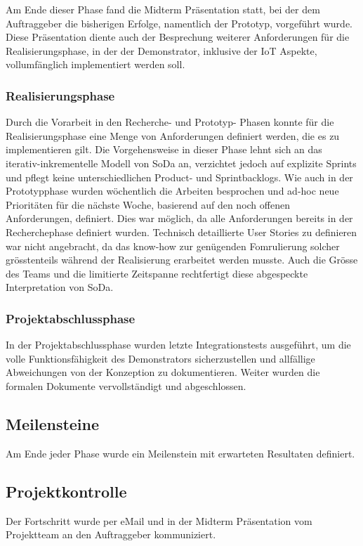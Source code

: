 Am Ende dieser Phase fand die Midterm Präsentation statt, bei der dem Auftraggeber die bisherigen Erfolge, namentlich der Prototyp, vorgeführt wurde. Diese Präsentation diente auch der Besprechung weiterer Anforderungen für die Realisierungsphase, in der der Demonstrator, inklusive der IoT Aspekte, vollumfänglich implementiert werden soll.

\subsubsection{Realisierungsphase}
\label{pm_subsubsec:Realisierungsphase}
Durch die Vorarbeit in den Recherche- und Prototyp- Phasen konnte für die Realisierungsphase eine Menge von Anforderungen definiert werden, die es zu implementieren gilt. Die Vorgehensweise in dieser Phase lehnt sich an das iterativ-inkrementelle Modell von SoDa an, verzichtet jedoch auf explizite Sprints und pflegt keine unterschiedlichen Product- und Sprintbacklogs. Wie auch in der Prototypphase wurden wöchentlich die Arbeiten besprochen und ad-hoc neue Prioritäten für die nächste Woche, basierend auf den noch offenen Anforderungen, definiert. Dies war möglich, da alle Anforderungen bereits in der Recherchephase definiert wurden. Technisch detaillierte User Stories zu definieren war nicht angebracht, da das know-how zur genügenden Fomrulierung solcher grösstenteils während der Realisierung erarbeitet werden musste. Auch die Grösse des Teams und die limitierte Zeitspanne rechtfertigt diese abgespeckte Interpretation von SoDa.

\subsubsection{Projektabschlussphase}
\label{pm_subsubsec:Projektabschlussphase}
In der Projektabschlussphase wurden letzte Integrationstests ausgeführt, um die volle Funktionsfähigkeit des Demonstrators sicherzustellen und allfällige Abweichungen von der Konzeption zu dokumentieren. Weiter wurden die formalen Dokumente vervollständigt und abgeschlossen.

\subsection{Meilensteine}
Am Ende jeder Phase wurde ein Meilenstein mit erwarteten Resultaten definiert.

\subsection{Projektkontrolle}
Der Fortschritt wurde per eMail und in der Midterm Präsentation vom Projektteam an den Auftraggeber kommuniziert.

